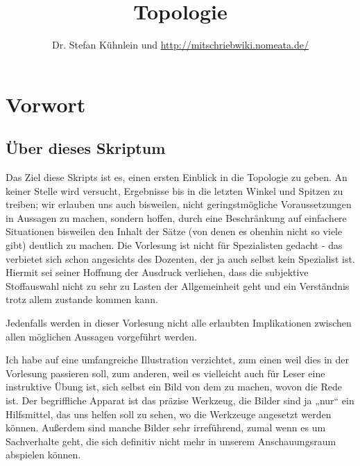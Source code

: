 \documentclass[12pt]{scrbook}   %
\author{Dr. Stefan Kühnlein und \url{http://mitschriebwiki.nomeata.de/}}
\title{Topologie}
\begin{document}
\maketitle

\tableofcontents


\chapter{Vorwort}

\section*{Über dieses Skriptum}

Das Ziel diese Skripts ist es, einen ersten Einblick in die Topologie zu geben.
An keiner Stelle wird versucht, Ergebnisse bis in die letzten Winkel und 
Spitzen zu treiben; wir erlauben uns auch bisweilen, nicht geringstmögliche 
Voraussetzungen in Aussagen zu machen, sondern hoffen, durch eine 
Beschränkung auf einfachere Situationen bisweilen den Inhalt der Sätze
(von denen es ohenhin nicht so viele gibt) deutlich zu machen. Die Vorlesung
ist nicht für Spezialisten gedacht - das verbietet sich schon angesichts des
Dozenten, der ja auch selbst kein Spezialist ist. Hiermit sei seiner Hoffnung 
der Ausdruck verliehen, dass die subjektive Stoffauswahl nicht zu sehr zu 
Lasten der Allgemeinheit geht und ein Verständnis trotz allem zustande
kommen kann.

Jedenfalls werden in dieser Vorlesung nicht alle erlaubten Implikationen 
zwischen allen möglichen Aussagen vorgeführt werden. 

Ich habe auf eine umfangreiche Illustration verzichtet, zum einen weil dies in 
der Vorlesung passieren soll, zum 
anderen, weil es vielleicht auch für Leser eine instruktive Übung ist, sich
selbst ein Bild von dem zu machen, wovon die Rede ist. Der begriffliche 
Apparat ist das präzise Werkzeug, die Bilder sind ja „nur“ ein 
Hilfsmittel, das uns helfen soll zu sehen, wo die Werkzeuge angesetzt werden 
können. Außerdem sind manche Bilder sehr irreführend, zumal wenn es um
Sachverhalte geht, die sich definitiv nicht mehr in unserem Anschauungsraum
abspielen können.
\end{document}
